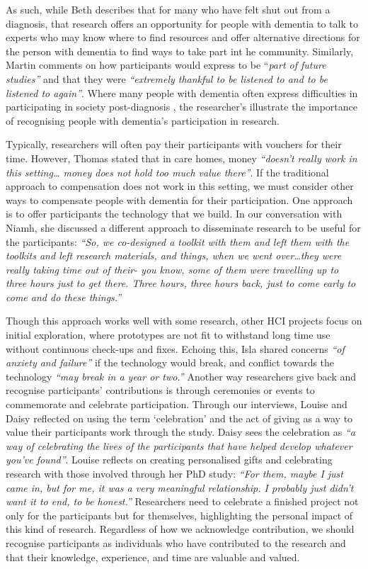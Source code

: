 As such, while Beth describes that for many who have felt shut out from a diagnosis, that research offers an opportunity for people with dementia to talk to experts who may know where to find resources and offer alternative directions for the person with dementia to find ways to take part int he community. Similarly, Martin comments on how participants would express to be “\textit{part of future studies”} and that they were \textit{“extremely thankful to be listened to and to be listened to again”}. Where many people with dementia often express difficulties in participating in society post-diagnosis \citep{bartlett_citizenship_2014}, the researcher’s illustrate the importance of recognising people with dementia's participation in research.

Typically, researchers will often pay their participants with vouchers for their time. However, Thomas stated that in care homes, money \textit{“doesn’t really work in this setting… money does not hold too much value there”}. If the traditional approach to compensation does not work in this setting, we must consider other ways to compensate people with dementia for their participation. One approach is to offer participants the technology that we build. In our conversation with Niamh, she discussed a different approach to disseminate research to be useful for the participants: \textit{“So, we co-designed a toolkit with them and left them with the toolkits and left research materials, and things, when we went over…they were really taking time out of their- you know, some of them were travelling up to three hours just to get there. Three hours, three hours back, just to come early to come and do these things.”}

Though this approach works well with some research, other HCI projects focus on initial exploration, where prototypes are not fit to withstand long time use without continuous check-ups and fixes. Echoing this, Isla shared concerns \textit{“of anxiety and failure”} if the technology would break, and conflict towards the technology \textit{“may break in a year or two.”} Another way researchers give back and recognise participants’ contributions is through ceremonies or events to commemorate and celebrate participation. Through our interviews, Louise and Daisy reflected on using the term ‘celebration’ and the act of giving as a way to value their participants work through the study. Daisy sees the celebration as \textit{“a way of celebrating the lives of the participants that have helped develop whatever you’ve found”}. Louise reflects on creating personalised gifts and celebrating research with those involved through her PhD study: \textit{“For them, maybe I just came in, but for me, it was a very meaningful relationship. I probably just didn’t want it to end, to be honest.”} Researchers need to celebrate a finished project not only for the participants but for themselves, highlighting the personal impact of this kind of research. Regardless of how we acknowledge contribution, we should recognise participants as individuals who have contributed to the research and that their knowledge, experience, and time are valuable and valued.

